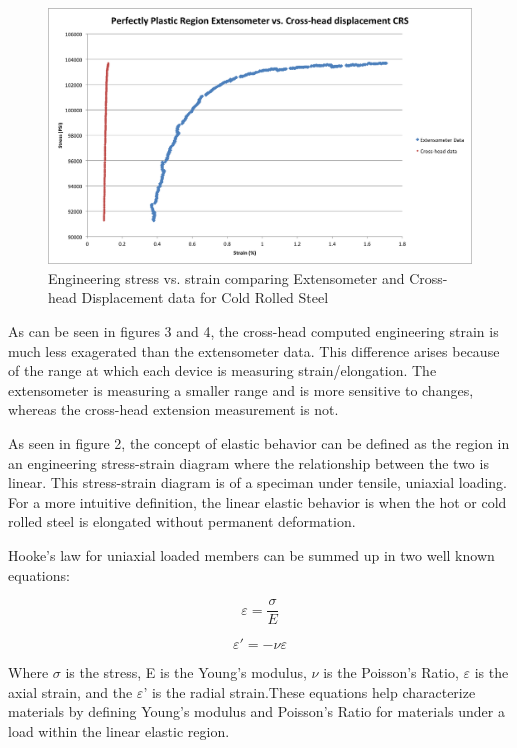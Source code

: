 \documentclass[12pt]{report}
\begin{document}
\begin{figure}[H]
	\includegraphics[width=1\textwidth]{extensometer_vs_crosshead_CRS.png}
	\caption{Engineering stress vs. strain comparing Extensometer and Cross-head Displacement data for Cold Rolled Steel}
	\label{fig:Figure4}
\end{figure}

As can be seen in figures 3 and 4, the cross-head computed engineering strain is much less exagerated than the extensometer data. This difference arises because of the range at which each device is measuring strain/elongation. The extensometer is measuring a smaller range and is more sensitive to changes, whereas the cross-head extension measurement is not.

As seen in figure 2, the concept of elastic behavior can be defined as the region in an engineering stress-strain diagram where the relationship between the two is linear. This stress-strain diagram is of a speciman under tensile, uniaxial loading. For a more intuitive definition, the linear elastic behavior is when the hot or cold rolled steel is elongated without permanent deformation. 

Hooke's law for uniaxial loaded members can be summed up in two well known equations:

\begin{equation}
        \varepsilon = \frac{\sigma}{E}
	\label{equation:youngmodulus}
\end{equation}

\begin{equation}
	\varepsilon' = -\nu \varepsilon
	\label{equation:poissonsratio}
\end{equation}

Where \(\sigma\) is the stress, E is the Young's modulus, \(\nu\) is the Poisson's Ratio, \(\varepsilon\) is the axial strain, and the \(\varepsilon\)' is the radial strain.These equations help characterize materials by defining Young's modulus and Poisson's Ratio for materials under a load within the linear elastic region. 
\end{document}
